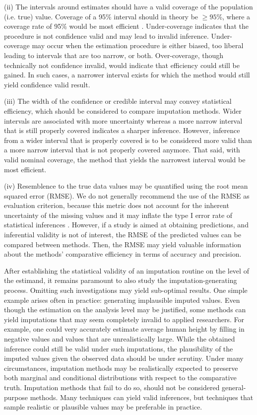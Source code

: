 \documentclass[bimj,fleqn]{w-art}
\begin{document}
(ii) The intervals around estimates should have a valid coverage of the population (i.e. true) value. Coverage of a 95\% interval should in theory be $\geq 95$\%, where a coverage rate of 95\% would be most efficient \citep[p. 589]{neym34}. Under-coverage indicates that the procedure is not confidence valid and may lead to invalid inference. Under-coverage may occur when the estimation procedure is either biased, too liberal leading to intervals that are too narrow, or both. Over-coverage, though technically not confidence invalid, would indicate that efficiency could still be gained. In such cases, a narrower interval exists for which the method would still yield confidence valid result. 

(iii) The width of the confidence or credible interval may convey statistical efficiency, which should be considered to compare imputation methods. Wider intervals are associated with more uncertainty whereas a more narrow interval that is still properly covered indicates a sharper inference. However, inference from a wider interval that is properly covered is to be considered more valid than a more narrow interval that is not properly covered anymore. That said, with valid nominal coverage, the method that yields the narrowest interval would be most efficient. 

(iv) Resemblence to the true data values may be quantified using the root mean squared error (RMSE). We do not generally recommend the use of the RMSE as evaluation criterion, because this metric does not account for the inherent uncertainty of the missing values and it may inflate the type I error rate of statistical inferences \citep[Chapter 2.6][]{buur18}. However, if a study is aimed at obtaining predictions, and inferential validity is not of interest, the RMSE of the predicted values can be compared between methods. Then, the RMSE may yield valuable information about the methods' comparative efficiency in terms of accuracy and precision. 

After establishing the statistical validity of an imputation routine on the level of the estimand, it remains paramount to also study the imputation-generating process. Omitting such investigations may yield sub-optimal results. One simple example arises often in practice: generating implausible imputed values. Even though the estimation on the analysis level may be justified, some methods can yield imputations that may seem completely invalid to applied researchers. For example, one could very accurately estimate average human height by filling in negative values and values that are unrealistically large. While the obtained inference could still be valid under such imputations, the plausibility of the imputed values given the observed data should be under scrutiny. Under many circumstances, imputation methods may be realistically expected to preserve both marginal and conditional distributions with respect to the comparative truth. Imputation methods that fail to do so, should not be considered general-purpose methods. Many techniques can yield valid inferences, but techniques that sample realistic or plausible values may be preferable in practice. 
\end{document}

